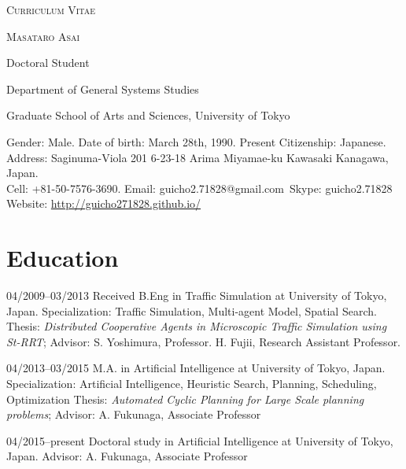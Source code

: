 \documentclass[letterpaper]{article}
\begin{document}
\pagestyle{empty}

\begin{center}
\huge{\textsc{Curriculum Vitae}}
\vspace{0.7\baselineskip}

\Large{\textsc{Masataro Asai}}
\vspace{0.5\baselineskip}

\large{
Doctoral Student

Department of General Systems Studies

Graduate School of Arts and Sciences, University of Tokyo
}

\vspace{0.8\baselineskip}

\normalsize{
 Gender: Male. Date of birth: March 28th, 1990. Present Citizenship: Japanese. \\
 Address: Saginuma-Viola 201 6-23-18 Arima Miyamae-ku Kawasaki Kanagawa, Japan. \\
 Cell: +81-50-7576-3690. Email: guicho2.71828@gmail.com\ Skype: guicho2.71828\\
 Website: \url{http://guicho271828.github.io/}}
\end{center}


\section{Education}

\begin{CV}
 \item[04/2009--03/2013] Received B.Eng in Traffic Simulation at University of Tokyo, Japan.
 Specialization: Traffic Simulation, Multi-agent Model, Spatial Search.
 {\small Thesis: \emph{Distributed Cooperative Agents in Microscopic
 Traffic Simulation using St-RRT}; Advisor: S. Yoshimura,
 Professor. H. Fujii, Research Assistant Professor.}

 \item[04/2013--03/2015] M.A. in Artificial Intelligence at University of Tokyo, Japan.
 Specialization: Artificial Intelligence, Heuristic Search, Planning, Scheduling, Optimization
 {\small Thesis: \emph{Automated Cyclic Planning for Large Scale planning problems};
 Advisor: A. Fukunaga, Associate Professor}

 \item[04/2015--present] Doctoral study in Artificial Intelligence at
 University of Tokyo, Japan. {\small Advisor: A. Fukunaga, Associate Professor}
\end{CV}
\end{document}
